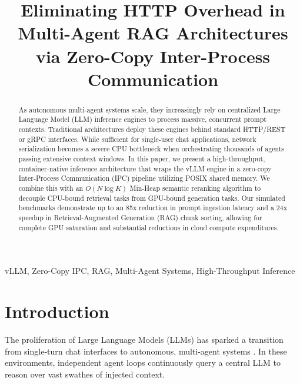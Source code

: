 \documentclass[conference]{IEEEtran}
\begin{document}
\title{Eliminating HTTP Overhead in Multi-Agent RAG Architectures via Zero-Copy Inter-Process Communication\\
}

\author{
}

\maketitle

\begin{abstract}
As autonomous multi-agent systems scale, they increasingly rely on centralized Large Language Model (LLM) inference engines to process massive, concurrent prompt contexts. Traditional architectures deploy these engines behind standard HTTP/REST or gRPC interfaces. While sufficient for single-user chat applications, network serialization becomes a severe CPU bottleneck when orchestrating thousands of agents passing extensive context windows. In this paper, we present a high-throughput, container-native inference architecture that wraps the vLLM engine in a zero-copy Inter-Process Communication (IPC) pipeline utilizing POSIX shared memory. We combine this with an $O(N \log K)$ Min-Heap semantic reranking algorithm to decouple CPU-bound retrieval tasks from GPU-bound generation tasks. Our simulated benchmarks demonstrate up to an 85x reduction in prompt ingestion latency and a 24x speedup in Retrieval-Augmented Generation (RAG) chunk sorting, allowing for complete GPU saturation and substantial reductions in cloud compute expenditures.
\end{abstract}

\begin{IEEEkeywords}
vLLM, Zero-Copy IPC, RAG, Multi-Agent Systems, High-Throughput Inference
\end{IEEEkeywords}

\section{Introduction}
The proliferation of Large Language Models (LLMs) has sparked a transition from single-turn chat interfaces to autonomous, multi-agent systems \cite{wu2023autogen, qian2023chatdev}. In these environments, independent agent loops continuously query a central LLM to reason over vast swathes of injected context. 
\end{document}
